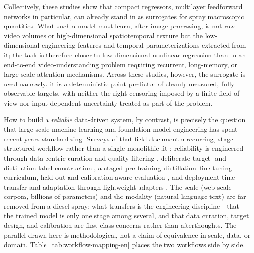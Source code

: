 Collectively, these studies show that compact regressors, multilayer feedforward networks in particular, can already stand in as surrogates for spray macroscopic quantities. What such a model must learn, after image processing, is not raw video volumes or high-dimensional spatiotemporal texture but the low-dimensional engineering features and temporal parameterizations extracted from it; the task is therefore closer to low-dimensional nonlinear regression than to an end-to-end video-understanding problem requiring recurrent, long-memory, or large-scale attention mechanisms. Across these studies, however, the surrogate is used narrowly: it is a deterministic point predictor of cleanly measured, fully observable targets, with neither the right-censoring imposed by a finite field of view nor input-dependent uncertainty treated as part of the problem.

How to build a \emph{reliable} data-driven system, by contrast, is precisely the question that large-scale machine-learning and foundation-model engineering has spent recent years standardizing. Surveys of that field document a recurring, stage-structured workflow rather than a single monolithic fit \cite{Zhao2023LLMSurvey,Bommasani2021FoundationModels}: reliability is engineered through data-centric curation and quality filtering \cite{Albalak2024DataSelection}, deliberate target- and distillation-label construction \cite{Xu2024LLMDistillation,Liu2024SyntheticData}, a staged pre-training--distillation--fine-tuning curriculum, held-out and calibration-aware evaluation \cite{Chang2024LLMEval}, and deployment-time transfer and adaptation through lightweight adapters \cite{Han2024PEFT}. The scale (web-scale corpora, billions of parameters) and the modality (natural-language text) are far removed from a diesel spray; what transfers is the engineering discipline---that the trained model is only one stage among several, and that data curation, target design, and calibration are first-class concerns rather than afterthoughts. The parallel drawn here is methodological, not a claim of equivalence in scale, data, or domain. Table~\ref{tab:workflow-mapping-en} places the two workflows side by side.

